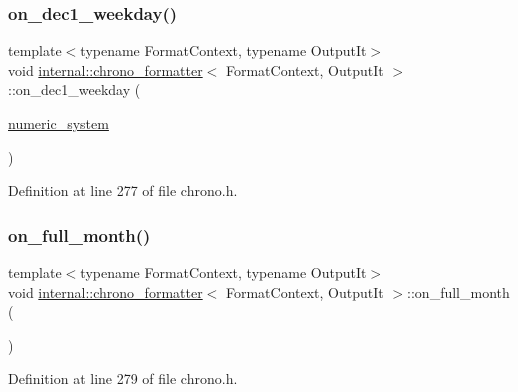 \subsubsection{\texorpdfstring{on\+\_\+dec1\+\_\+weekday()}{on\_dec1\_weekday()}}
{\footnotesize\ttfamily template$<$typename Format\+Context, typename Output\+It$>$ \\
void \hyperlink{structinternal_1_1chrono__formatter}{internal\+::chrono\+\_\+formatter}$<$ Format\+Context, Output\+It $>$\+::on\+\_\+dec1\+\_\+weekday (\begin{DoxyParamCaption}\item[{\hyperlink{namespaceinternal_a16e2a1195ca0f5beab658685f71df86b}{numeric\+\_\+system}}]{ }\end{DoxyParamCaption})\hspace{0.3cm}{\ttfamily [inline]}}



Definition at line 277 of file chrono.\+h.

\mbox{\label{structinternal_1_1chrono__formatter_a37539cac3a3f1241481e146a20780713}} 
\subsubsection{\texorpdfstring{on\+\_\+full\+\_\+month()}{on\_full\_month()}}
{\footnotesize\ttfamily template$<$typename Format\+Context, typename Output\+It$>$ \\
void \hyperlink{structinternal_1_1chrono__formatter}{internal\+::chrono\+\_\+formatter}$<$ Format\+Context, Output\+It $>$\+::on\+\_\+full\+\_\+month (\begin{DoxyParamCaption}{ }\end{DoxyParamCaption})\hspace{0.3cm}{\ttfamily [inline]}}



Definition at line 279 of file chrono.\+h.

\mbox{\label{structinternal_1_1chrono__formatter_a0cc88bff82e826562f7870c4ef11ab02}} 
